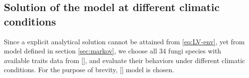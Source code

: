 

\subsection{Solution of the model at different climatic conditions}

Since a explicit analytical solution cannot be attained from \eqref{eq:LV-env}, yet from model defined in section \ref{sec:markov}, we choose all 34 fungi species with available traits data from [], and evaluate their behaviors under different climatic conditions. For the purpose of brevity, [] model is chosen.

